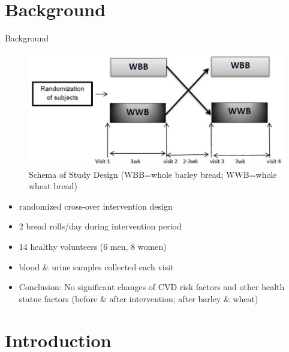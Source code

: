 \documentclass{beamer}
\begin{document}
\section{Background}
 \begin{frame}{Background}
 \begin{figure}[h]
    \centering
    \includegraphics[scale=0.3]{images/studes.PNG}
    \caption{Schema of Study Design (WBB=whole barley bread; WWB=whole wheat bread)}
        \label{fig:studes}
\end{figure}

\begin{itemize}
\item randomized cross-over intervention design
\item 2 bread rolls/day during intervention period
\item 14 healthy volunteers (6 men, 8 women)
\item blood \& urine samples collected each visit
\item Conclusion: No significant changes of CVD risk factors and other health statue factors (before \& after intervention; after barley \& wheat)
\end{itemize}
 \end{frame}
 

\section{Introduction}
\end{document}
